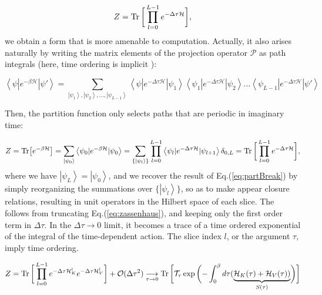 \begin{equation}\label{eq:partBreak}
Z =  \operatorname{Tr} \bigg[ \prod_{l=0}^{L-1} e^{-\Delta\tau \mathcal{H} } \bigg] ,
\end{equation}
we obtain a form that is more amenable to computation.
Actually, it also arises naturally by writing the matrix elements of the projection operator $\mathcal{P}$ as path integrals (here, time ordering is implicit \cite{hirsch_discrete_1983}):

\begin{equation}
\left\langle \psi | e^{-\beta \mathcal{H} } | \psi' \right\rangle = \sum_{\left| \psi_1 \right\rangle, \left| \psi_2 \right\rangle,..., \left| \psi_{L-1} \right\rangle }  \left\langle \psi | e^{-\Delta \tau \mathcal{H} } | \psi_1 \right\rangle \left\langle \psi_1 | e^{-\Delta \tau \mathcal{H} } | \psi_2 \right\rangle ... \left\langle \psi_{L - 1} | e^{-\Delta \tau \mathcal{H} } | \psi' \right\rangle 
\end{equation}

Then, the partition function only selects paths that are periodic in imaginary time:

\begin{equation}
Z = \text{Tr} \big[ e^{-\beta \mathcal{H} } \big] = \sum_{\left| \psi_0 \right\rangle} \left\langle \psi_0 | e^{-\beta \mathcal{H}} | \psi_0 \right\rangle = \sum_{\{ \left| \psi_l \right\rangle \}} \prod_{l = 0}^{L - 1} \left\langle \psi_{l} | e^{-\Delta \tau \mathcal{H} } | \psi_{l+1} \right\rangle \delta_{0, L} = \operatorname{Tr} \bigg[ \prod_{l=0}^{L-1} e^{-\Delta\tau \mathcal{H} } \bigg] ,
\end{equation}
where we have $\left| \psi_L \right\rangle = \left| \psi_0 \right\rangle$, and we  recover the result of Eq.(\ref{eq:partBreak}) by simply reorganizing the summations over $\{ \left| \psi_l \right\rangle \}$, so as to make appear closure relations, resulting in unit operators in the Hilbert space of each slice.
The  follows from truncating Eq.(\ref{eq:zassenhaus}), and keeping only the first order term in $\Delta \tau$.
In the $\Delta \tau \rightarrow 0$ limit, it becomes a trace of a time ordered exponential of the integral of the time-dependent action.
The slice index $l$, or the argument $\tau$, imply time ordering.

\begin{equation}\label{eq:Z_propagator}
Z = \operatorname{Tr} \bigg[ \prod_{l=0}^{L-1} e^{-\Delta\tau \mathcal{H}_{K}^l } e^{-\Delta\tau \mathcal{H}_{V}^l } \bigg] + \mathcal{O}(\Delta \tau^2) \underset{\tau \rightarrow 0}{\longrightarrow}
 \operatorname{Tr} \bigg[ \mathcal{T}_\tau \exp \bigg( {- \int_0^\beta   d\tau ( \underbrace{\mathcal{H}_K (\tau) + \mathcal{H}_V ( \tau) ) }_{S(\tau)} } \bigg) \bigg]
\end{equation}

